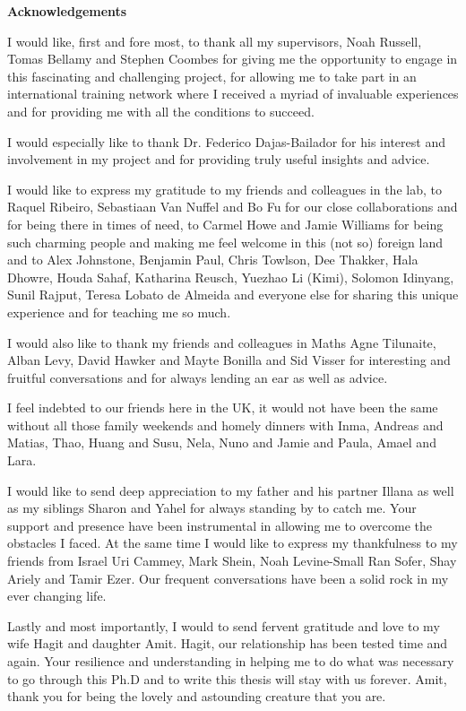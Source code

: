 
\vspace*{1.5cm}

{\Huge\textbf{Acknowledgements}}

\vspace*{1.5cm}

I would like, first and fore most, to thank all my supervisors, Noah Russell, Tomas Bellamy and Stephen Coombes for giving me the opportunity to engage in this fascinating and challenging project, for allowing me to take part in an international training network where I received a myriad of invaluable experiences and for providing me with all the conditions to succeed.

I would especially like to thank Dr. Federico Dajas-Bailador for his interest and involvement in my project and for providing truly useful insights and advice.

I would like to express my gratitude to my friends and colleagues in the lab, to Raquel Ribeiro, Sebastiaan Van Nuffel and Bo Fu for our close collaborations and for being there in times of need, to Carmel Howe and Jamie Williams for being such charming people and making me feel welcome in this (not so) foreign land and to Alex Johnstone, Benjamin Paul, Chris Towlson, Dee Thakker, Hala Dhowre, Houda Sahaf, Katharina Reusch, Yuezhao Li (Kimi), Solomon Idinyang, Sunil Rajput, Teresa Lobato de Almeida and everyone else for sharing this unique experience and for teaching me so much.

I would also like to thank my friends and colleagues in Maths Agne Tilunaite, Alban Levy, David Hawker and Mayte Bonilla and Sid Visser for interesting and fruitful conversations and for always lending an ear as well as advice.

I feel indebted to our friends here in the UK, it would not have been the same without all those family weekends and homely dinners with Inma, Andreas and Matias, Thao, Huang and Susu, Nela, Nuno and Jamie and Paula, Amael and Lara.

I would like to send deep appreciation to my father and his partner Illana as well as my siblings Sharon and Yahel for always standing by to catch me. Your support and presence have been instrumental in allowing me to overcome the obstacles I faced. At the same time I would like to express my thankfulness to my friends from Israel Uri Cammey, Mark Shein, Noah Levine-Small Ran Sofer, Shay Ariely and Tamir Ezer. Our frequent conversations have been a solid rock in my ever changing life.

Lastly and most importantly, I would to send fervent gratitude and love to my wife Hagit and daughter Amit. Hagit, our relationship has been tested time and again. Your resilience and understanding in helping me to do what was necessary to go through this Ph.D and to write this thesis will stay with us forever. Amit, thank you for being the lovely and astounding creature that you are.
